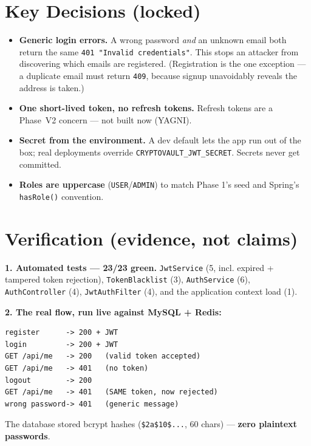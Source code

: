 \documentclass[11pt,a4paper]{article}
\newcommand{\code}[1]{\texttt{#1}}
\begin{document}
\section{Key Decisions (locked)}
\begin{itemize}[leftmargin=*]
  \item \textbf{Generic login errors.} A wrong password \emph{and} an unknown email both return the
        same \code{401 "Invalid credentials"}. This stops an attacker from discovering which emails
        are registered. (Registration is the one exception --- a duplicate email must return
        \code{409}, because signup unavoidably reveals the address is taken.)
  \item \textbf{One short-lived token, no refresh tokens.} Refresh tokens are a Phase~V2 concern ---
        not built now (YAGNI).
  \item \textbf{Secret from the environment.} A dev default lets the app run out of the box; real
        deployments override \code{CRYPTOVAULT\_JWT\_SECRET}. Secrets never get committed.
  \item \textbf{Roles are uppercase} (\code{USER}/\code{ADMIN}) to match Phase 1's seed and Spring's
        \code{hasRole()} convention.
\end{itemize}

\section{Verification (evidence, not claims)}
\begin{done}
\textbf{1. Automated tests --- 23/23 green.} \code{JwtService} (5, incl. expired + tampered token
rejection), \code{TokenBlacklist} (3), \code{AuthService} (6), \code{AuthController} (4),
\code{JwtAuthFilter} (4), and the application context load (1).
\end{done}

\begin{done}
\textbf{2. The real flow, run live against MySQL + Redis:}
\begin{lstlisting}
register      -> 200 + JWT
login         -> 200 + JWT
GET /api/me   -> 200   (valid token accepted)
GET /api/me   -> 401   (no token)
logout        -> 200
GET /api/me   -> 401   (SAME token, now rejected)
wrong password-> 401   (generic message)
\end{lstlisting}
The database stored bcrypt hashes (\code{\$2a\$10\$...}, 60 chars) --- \textbf{zero plaintext
passwords}.
\end{done}
\end{document}
